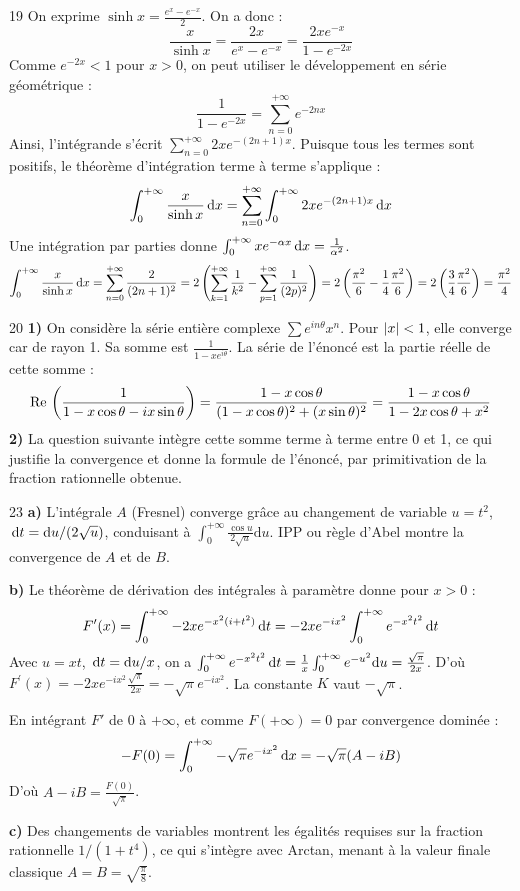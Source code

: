 \begin{correction}{19}
On exprime $\sinh x = \frac{e^x - e^{-x}}{2}$. On a donc :
$$ \frac{x}{\sinh x} = \frac{2x}{e^x - e^{-x}} = \frac{2xe^{-x}}{1 - e^{-2x}} $$
Comme $e^{-2x} < 1$ pour $x > 0$, on peut utiliser le développement en série géométrique :
$$ \frac{1}{1-e^{-2x}} = \sum_{n=0}^{+\infty} e^{-2nx} $$
Ainsi, l'intégrande s'écrit $\sum_{n=0}^{+\infty} 2x e^{-(2n+1)x}$.
Puisque tous les termes sont positifs, le théorème d'intégration terme à terme s'applique :
$$ \int_{0}^{+\infty}\frac{x}{\sinh x}\,\mathrm{d}x = \sum_{n=0}^{+\infty} \int_{0}^{+\infty} 2x e^{-(2n+1)x} \,\mathrm{d}x $$
Une intégration par parties donne $\int_{0}^{+\infty} x e^{-\alpha x} \,\mathrm{d}x = \frac{1}{\alpha^2}$.
$$ \int_{0}^{+\infty}\frac{x}{\sinh x}\,\mathrm{d}x = \sum_{n=0}^{+\infty} \frac{2}{(2n+1)^2} = 2 \left( \sum_{k=1}^{+\infty}\frac{1}{k^2} - \sum_{p=1}^{+\infty}\frac{1}{(2p)^2} \right) = 2 \left( \frac{\pi^2}{6} - \frac{1}{4}\frac{\pi^2}{6} \right) = 2 \left( \frac{3}{4}\frac{\pi^2}{6} \right) = \frac{\pi^2}{4} $$
\end{correction}

\begin{correction}{20}
\textbf{1)} On considère la série entière complexe $\sum e^{in\theta} x^n$. Pour $\left|x\right| < 1$, elle converge car de rayon 1. Sa somme est $\frac{1}{1-x e^{i\theta}}$.
La série de l'énoncé est la partie réelle de cette somme :
$$ \operatorname{Re} \,\left(\frac{1}{1-x\cos\theta - i x\sin\theta}\right) = \frac{1-x\cos\theta}{(1-x\cos\theta)^2 + (x\sin\theta)^2} = \frac{1-x\cos\theta}{1-2x\cos\theta + x^2} $$
\textbf{2)} La question suivante intègre cette somme terme à terme entre 0 et 1, ce qui justifie la convergence et donne la formule de l'énoncé, par primitivation de la fraction rationnelle obtenue.
\end{correction}

\begin{correction}{23}
\textbf{a)} L'intégrale $A$ (Fresnel) converge grâce au changement de variable $u=t^2$, $\,\mathrm{d}t = \mathrm{d}u/(2\sqrt{u})$, conduisant à $\int_0^{+\infty} \frac{\cos u}{2\sqrt{u}} \mathrm{d}u$. IPP ou règle d'Abel montre la convergence de $A$ et de $B$.

\textbf{b)} Le théorème de dérivation des intégrales à paramètre donne pour $x>0$ :
$$ F^{\prime}(x) = \int_{0}^{+\infty} -2x e^{-x^2(i+t^2)} \,\mathrm{d}t = -2x e^{-ix^2} \int_{0}^{+\infty} e^{-x^2 t^2} \,\mathrm{d}t $$
Avec $u = xt$, $\,\mathrm{d}t = \mathrm{d}u/x$, on a $\int_{0}^{+\infty} e^{-x^2 t^2} \,\mathrm{d}t = \frac{1}{x} \int_{0}^{+\infty} e^{-u^2} \mathrm{d}u = \frac{\sqrt{\pi}}{2x}$.
D'où $F^{\prime}(x) = -2x e^{-ix^2} \frac{\sqrt{\pi}}{2x} = -\sqrt{\pi} e^{-ix^2}$.
La constante $K$ vaut $-\sqrt{\pi}$.

En intégrant $F'$ de $0$ à $+\infty$, et comme $F(+\infty) = 0$ par convergence dominée :
$$ -F(0) = \int_{0}^{+\infty} -\sqrt{\pi} e^{-ix^2} \,\mathrm{d}x = -\sqrt{\pi}(A - iB) $$
D'où $A-iB = \frac{F(0)}{\sqrt{\pi}}$.

\textbf{c)} Des changements de variables montrent les égalités requises sur la fraction rationnelle $1/(1+t^4)$, ce qui s'intègre avec Arctan, menant à la valeur finale classique $A=B=\sqrt{\frac{\pi}{8}}$.
\end{correction}

